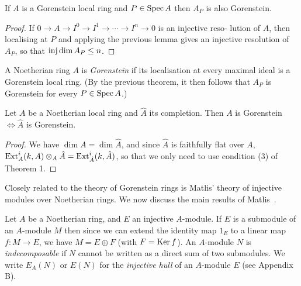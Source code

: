 \begin{theorem}\label{thm:18.2}
If $A$ is a Gorenstein local ring and $P \in \operatorname{Spec} A$ then $A_P$ is also
Gorenstein.
\end{theorem}

\begin{proof}
If $0 \to A \to I^0 \to I^1 \to \cdots \to I^n \to 0$ is an injective reso-
lution of $A$, then localising at $P$ and applying the previous lemma gives an
injective resolution of $A_P$, so that $\operatorname{inj\,dim} A_P \le n$.
\end{proof}

\begin{definition}
A Noetherian ring $A$ is \emph{Gorenstein} if its localisation at every
maximal ideal is a Gorenstein local ring. (By the previous theorem, it then
follows that $A_P$ is Gorenstein for every $P \in \operatorname{Spec} A$.)
\end{definition}

\begin{theorem}\label{thm:18.3}
Let $A$ be a Noetherian local ring and $\hat{A}$ its completion.
Then $A$ is Gorenstein $\iff \hat{A}$ is Gorenstein.
\end{theorem}

\begin{proof}
We have $\dim A = \dim \hat{A}$, and since $\hat{A}$ is faithfully flat over $A$,
$\operatorname{Ext}^i_A(k, A) \otimes_A \hat{A} = \operatorname{Ext}^i_{\hat{A}}(k, \hat{A})$, so that we only need to use condition (3)
of Theorem 1.
\end{proof}

Closely related to the theory of Gorenstein rings is Matlis' theory
of injective modules over Noetherian rings. We now discuss the main
results of Matlis~\cite{Matl1}.

Let $A$ be a Noetherian ring, and $E$ an injective $A$-module. If $E$ is a
submodule of an $A$-module $M$ then since we can extend the identity map
$1_E$ to a linear map $f\colon M \to E$, we have $M = E \oplus F$ (with $F = \operatorname{Ker} f$).
An $A$-module $N$ is \emph{indecomposable} if $N$ cannot be written as a direct
sum of two submodules. We write $E_A(N)$ or $E(N)$ for the \emph{injective hull}
of an $A$-module $E$ (see Appendix B).

